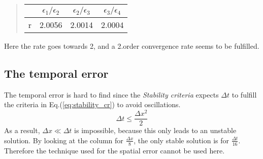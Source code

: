 \documentclass[%
twoside,                 %
final,                   %
chapterprefix=true,      %
open=right               %
10pt]{book}
\begin{document}
\begin{quote}
\begin{tabular}{cccc}
\hline
\multicolumn{1}{c}{  } & \multicolumn{1}{c}{ $\epsilon_1/\epsilon_2$ } & \multicolumn{1}{c}{ $\epsilon_2/\epsilon_3$ } & \multicolumn{1}{c}{ $\epsilon_3/\epsilon_4$ } \\
\hline
r & 2.0056                  & 2.0014                  & 2.0004                  \\
\hline
\end{tabular}
\end{quote}

\noindent
Here the rate goes towards 2, and a 2.order convergence rate seems to be fulfilled.
\subsection{The temporal error}
The temporal error is hard to find since the \emph{Stability criteria} expects $\Delta t$ to fulfill the criteria in Eq.(\ref{eq:stability_cr}) to avoid oscillations.
\begin{equation} \label{eq:stability_cr}
 \Delta t \leq \frac{\Delta x^2}{2}
\end{equation}
As a result, $\Delta x \ll \Delta t$ is impossible, because this only leads to an unstable solution. By looking at the column for $\frac{\Delta x}{8}$, the only stable solution is for $\frac{\Delta t}{16}$. Therefore the technique used for the spatial error cannot be used here. 
\end{document}
